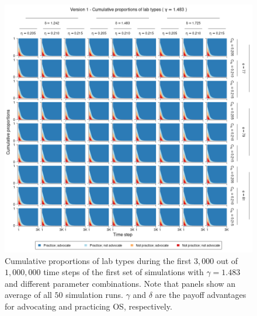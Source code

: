 \documentclass[meta, authordate,issue]{jote-new-article}
\begin{document}
%
%
\begin{figure}
  \begin{fullwidth}
    \centering
    \includegraphics[width=\textwidth]{v1_pro_plot_sens_payypro1.483.png}
    \caption{Cumulative proportions of lab types during the first $3,000$ out of $1,000,000$ time steps of the first set of simulations with $\gamma=1.483$ and different parameter combinations. Note that panels show an average of all $50$ simulation runs. $\gamma$ and $\delta$ are the payoff advantages for advocating and practicing OS, respectively.}
    \label{fig:v1_pro_plot_sens_payypro1.483}
  \end{fullwidth}
\end{figure}
%
%
\end{document}
